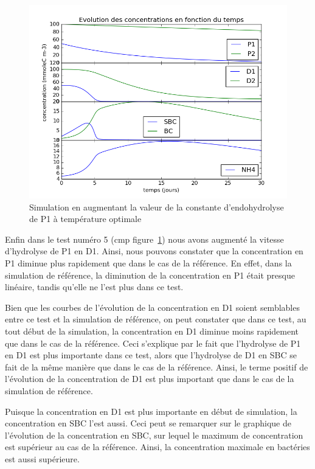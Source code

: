 \begin{figure}[h!]
  \includegraphics[width=\textwidth]{partie2/Test5.png}
  \caption{Simulation en augmentant la valeur de la constante d'endohydrolyse de P1 \`a temp\'erature optimale
  }
  \label{fig:partie2test5}
\end{figure}

\par{
Enfin dans le test numéro 5 (cmp figure~\ref{fig:partie2test5})
nous avons augment\'e la vitesse d'hydrolyse de P1 en D1. Ainsi, nous pouvons constater que la concentration en P1 diminue plus rapidement que dans le cas de la r\'ef\'erence. En effet, dans la simulation de r\'ef\'erence, la diminution de la concentration en P1 \'etait presque lin\'eaire, tandis qu'elle ne l'est plus dans ce test.
}
\par{
Bien que les courbes de l'\'evolution de la concentration en D1 soient semblables entre ce test et la simulation de r\'ef\'erence, on peut constater que dans ce test, au tout d\'ebut de la simulation, la concentration en D1 diminue moins rapidement que dans le cas de la r\'ef\'erence. Ceci s'explique par le fait que l'hydrolyse de P1 en D1 est plus importante dans ce test, alors que l'hydrolyse de D1 en SBC se fait de la m\^eme mani\`ere que dans le cas de la r\'ef\'erence. Ainsi, le terme positif de l'\'evolution de la concentration de D1 est plus important que dans le cas de la simulation de r\'ef\'erence.
}
\par{
Puisque la concentration en D1 est plus importante en d\'ebut de simulation, la concentration en SBC l'est aussi. Ceci peut se remarquer sur le graphique de l'\'evolution de la concentration en SBC, sur lequel le maximum de concentration est sup\'erieur au cas de la r\'ef\'erence. Ainsi, la concentration maximale en bact\'eries est aussi sup\'erieure.
}
 
